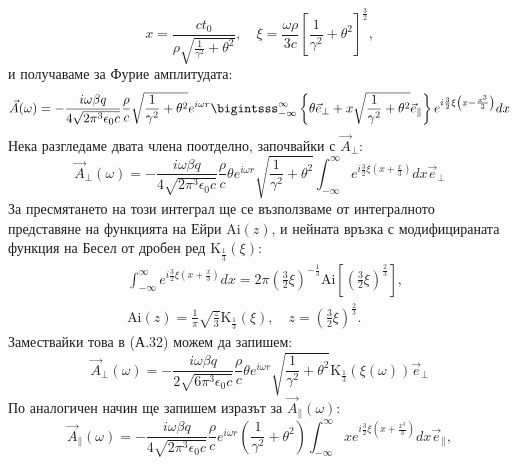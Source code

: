 \begin{appendices}
\begin{equation}
	x = \frac{ct_0}{\rho\sqrt{\frac{1}{\gamma^2} + \theta^2}},\quad \xi = \frac{\omega\rho}{3c}\left[\frac{1}{\gamma^2} + \theta^2\right]^{\frac{3}{2}},
\end{equation}
и получаваме за Фурие амплитудата:
\begin{equation}
	\vec{A}(\omega) = -\frac{i\omega\beta q}{4\sqrt{2\pi^3\epsilon_0 c}}\frac{\rho}{c}\sqrt{\frac{1}{\gamma^2}+\theta^2}e^{i\omega r}\bigintsss_{-\infty}^\infty\left\{\theta \vec{e}_\perp + x\sqrt{\frac{1}{\gamma^2} + \theta^2}\vec{e}_\parallel\right\}e^{i\frac{3}{2}\xi\left(x - \frac{x^3}{3}\right)}dx
\end{equation}
Нека разгледаме двата члена поотделно, започвайки с $\vec{A}_\perp$:
\begin{equation}
	\vec{A}_\perp(\omega)=-\frac{i\omega\beta q}{4\sqrt{2\pi^3\epsilon_0 c}}\frac{\rho}{c}\theta e^{i\omega r}\sqrt{\frac{1}{\gamma^2}+\theta^2}\int_{-\infty}^\infty e^{i\frac{3}{2}\xi\left(x + \frac{x}{3}\right)}dx \vec{e}_\perp
\end{equation}
За пресмятането на този интеграл ще се възползваме от интегралното представяне на функцията на Ейри $\text{Ai}(z)$, и нейната връзка с модифицираната функция на Бесел от дробен ред $\text{K}_{\frac{1}{3}}(\xi)$:
\begin{equation}
	\begin{split}
	&\int_{-\infty}^\infty e^{i\frac{3}{2}\xi\left(x + \frac{x}{3}\right)}dx = 2\pi\left(\frac{3}{2}\xi\right)^{-\frac{1}{3}}\text{Ai}\left[\left(\frac{3}{2}\xi\right)^{\frac{2}{3}}\right],\\
	&\text{Ai}(z) = \frac{1}{\pi}\sqrt{\frac{z}{3}}\text{K}_{\frac{1}{3}}(\xi),\quad z = \left(\frac{3}{2}\xi\right)^{\frac{2}{3}}.
	\end{split}
\end{equation}
Замествайки това в (А.32) можем да запишем:
\begin{equation}
	\vec{A}_\perp(\omega) = -\frac{i\omega\beta q}{2\sqrt{6\pi^3\epsilon_0 c}}\frac{\rho}{c}\theta e^{i\omega r}\sqrt{\frac{1}{\gamma^2} + \theta^2}\text{K}_{\frac{1}{3}}(\xi(\omega))\vec{e}_\perp
\end{equation}
По аналогичен начин ще запишем изразът за $\vec{A}_\parallel(\omega)$:
\begin{equation}
	\vec{A}_\parallel(\omega) = -\frac{i\omega\beta q}{4\sqrt{2\pi^3\epsilon_0 c}}\frac{\rho}{c}e^{i\omega r}\left(\frac{1}{\gamma^2} + \theta^2\right)\int_{-\infty}^\infty x e^{i\frac{3}{2}\xi\left(x + \frac{x^3}{3}\right)}dx \vec{e}_\parallel,

\end{equation}
\end{appendices}
